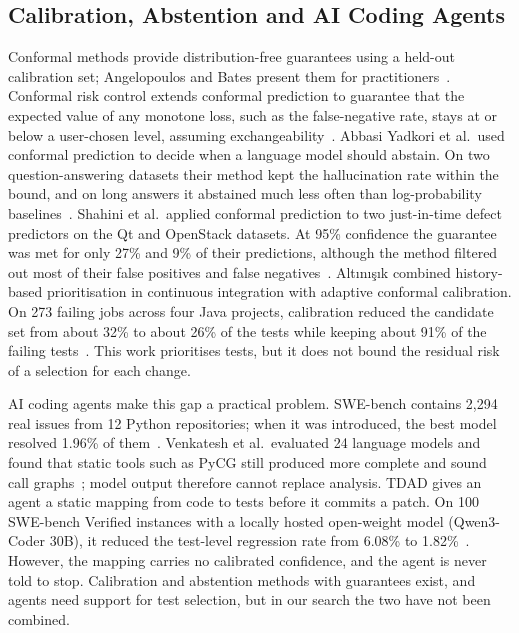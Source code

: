 \documentclass[conference]{IEEEtran}
\begin{document}
\subsection{Calibration, Abstention and AI Coding Agents}
Conformal methods provide distribution-free guarantees using a held-out calibration set; Angelopoulos and Bates present them for practitioners~\cite{angelopoulos2023gentle}. Conformal risk control extends conformal prediction to guarantee that the expected value of any monotone loss, such as the false-negative rate, stays at or below a user-chosen level, assuming exchangeability~\cite{angelopoulos2024crc}. Abbasi Yadkori et al.\ used conformal prediction to decide when a language model should abstain. On two question-answering datasets their method kept the hallucination rate within the bound, and on long answers it abstained much less often than log-probability baselines~\cite{yadkori2024abstention}. Shahini et al.\ applied conformal prediction to two just-in-time defect predictors on the Qt and OpenStack datasets. At 95\% confidence the guarantee was met for only 27\% and 9\% of their predictions, although the method filtered out most of their false positives and false negatives~\cite{shahini2024jitcp}. Alt{\i}n{\i}{\c{s}}{\i}k combined history-based prioritisation in continuous integration with adaptive conformal calibration. On 273 failing jobs across four Java projects, calibration reduced the candidate set from about 32\% to about 26\% of the tests while keeping about 91\% of the failing tests~\cite{altinisik2026conformal}. This work prioritises tests, but it does not bound the residual risk of a selection for each change.

AI coding agents make this gap a practical problem. SWE-bench contains 2,294 real issues from 12 Python repositories; when it was introduced, the best model resolved 1.96\% of them~\cite{jimenez2024swebench}. Venkatesh et al.\ evaluated 24 language models and found that static tools such as PyCG still produced more complete and sound call graphs~\cite{venkatesh2025llmcg}; model output therefore cannot replace analysis. TDAD gives an agent a static mapping from code to tests before it commits a patch. On 100 SWE-bench Verified instances with a locally hosted open-weight model (Qwen3-Coder 30B), it reduced the test-level regression rate from 6.08\% to 1.82\%~\cite{alonso2026tdad}. However, the mapping carries no calibrated confidence, and the agent is never told to stop. Calibration and abstention methods with guarantees exist, and agents need support for test selection, but in our search the two have not been combined.
\end{document}
